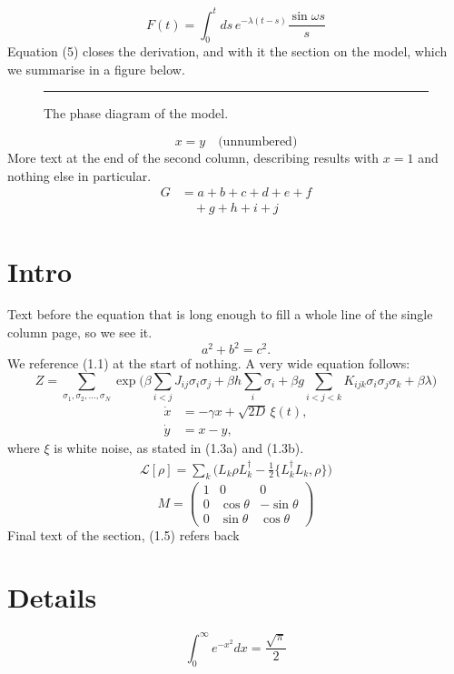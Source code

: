 \documentclass[twocolumn,10pt]{article}
\begin{document}
\begin{equation}
F(t) = \int_0^t ds\, e^{-\lambda (t-s)} \frac{\sin \omega s}{s}
\end{equation}
Equation (5) closes the derivation, and with it the section on the model, which we
summarise in a figure below.
\begin{figure}[h]
\centering
\rule{0.8\columnwidth}{3cm}
\caption{The phase diagram of the model.}
\end{figure}
\begin{equation*}
x = y \quad \text{(unnumbered)}
\end{equation*}
More text at the end of the second column, describing results with $x=1$ and nothing else in particular.
\begin{equation}
\begin{split}
G &= a + b + c + d + e + f \\
  &\quad + g + h + i + j
\end{split}
\end{equation}
\onecolumn
\renewcommand{\theequation}{\thesection.\arabic{equation}}
\section{Intro}\setcounter{equation}{0}
Text before the equation that is long enough to fill a whole line of the single column page, so we see it.
\begin{equation}
a^2 + b^2 = c^2 .
\end{equation}
We reference (1.1) at the start of nothing. A very wide equation follows:
\begin{equation}
Z = \sum_{\sigma_1, \sigma_2, \ldots, \sigma_N} \exp\Big( \beta \sum_{i<j} J_{ij} \sigma_i \sigma_j + \beta h \sum_i \sigma_i + \beta g \sum_{i<j<k} K_{ijk} \sigma_i\sigma_j\sigma_k + \beta \lambda \Big)
\end{equation}
\begin{subequations}
\begin{align}
\dot x &= -\gamma x + \sqrt{2D}\, \xi(t), \\
\dot y &= x - y ,
\end{align}
\end{subequations}
where $\xi$ is white noise, as stated in (1.3a) and (1.3b).
\begin{gather}
\mathcal{L}[\rho] = \sum_k \Big( L_k \rho L_k^\dagger - \tfrac12 \{ L_k^\dagger L_k, \rho\} \Big)
\end{gather}
\begin{equation}
M = \begin{pmatrix} 1 & 0 & 0 \\ 0 & \cos\theta & -\sin\theta \\ 0 & \sin\theta & \cos\theta \end{pmatrix}
\end{equation}
Final text of the section, (1.5) refers back
\appendix
\section{Details}
\renewcommand{\theequation}{A\arabic{equation}}
\setcounter{equation}{0}
\begin{equation}
\int_0^\infty e^{-x^2} dx = \frac{\sqrt\pi}{2}
\end{equation}
\end{document}
